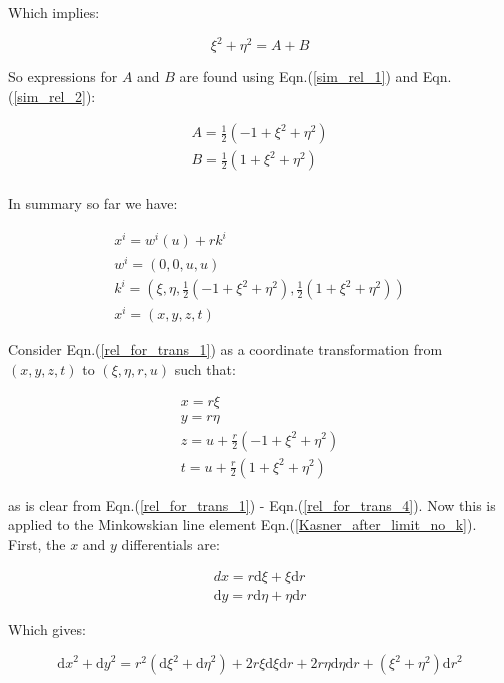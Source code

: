 \noindent Which implies:

\begin{equation}\label{sim_rel_2}
\xi^2 + \eta^2 = A + B 
\end{equation}

\noindent So expressions for $A$ and $B$ are found using Eqn.(\ref{sim_rel_1}) and Eqn.(\ref{sim_rel_2}):

\begin{eqnarray*}
A = \frac{1}{2} (-1 + \xi^2 + \eta^2) \\
B = \frac{1}{2} (1 + \xi^2 + \eta^2) \\
\end{eqnarray*}

In summary so far we have:

\begin{eqnarray}
x^i = w^i (u) + r k^i \label{rel_for_trans_1}\\
w^i = (0,0, u,u) \label{rel_for_trans_2}\\
k^i = (\xi, \eta, \frac{1}{2} (-1 + \xi^2 + \eta^2), \frac{1}{2} (1 + \xi^2 + \eta^2)) \label{rel_for_trans_3}\\
x^i = (x, y, z, t) \label{rel_for_trans_4}  
\end{eqnarray}

Consider Eqn.(\ref{rel_for_trans_1}) as a coordinate transformation from $(x,y,z,t)$ to $(\xi,\eta, r, u )$ such that:

\begin{eqnarray}
x = r \xi \nonumber \\
y = r \eta \nonumber \\
z = u + \frac{r}{2} (-1 + \xi^2 + \eta^2) \nonumber \\
t = u + \frac{r}{2} (1 + \xi^2 + \eta^2)  \label{trans_x_to_xi} 
\end{eqnarray} 

\noindent as is clear from Eqn.(\ref{rel_for_trans_1}) - Eqn.(\ref{rel_for_trans_4}). Now this is applied to the Minkowskian line element Eqn.(\ref{Kasner_after_limit_no_k}). First, the $x$ and $y$ differentials are:

\begin{eqnarray*} 
dx = r \mathrm{d}\xi + \xi \mathrm{d}r \\
\mathrm{d}y = r \mathrm{d}\eta + \eta \mathrm{d}r 
\end{eqnarray*} 

\noindent Which gives:

\begin{equation}\label{differentials_1}
{\mathrm{d}x}^2 + {\mathrm{d}y}^2 = r^2 ({\mathrm{d}\xi}^2 + {\mathrm{d}\eta}^2) + 2 r \xi {\mathrm{d}\xi} {\mathrm{d}r} + 2 r \eta {\mathrm{d}\eta}{\mathrm{d}r} + (\xi^2 + \eta^2) {\mathrm{d}r}^2
\end{equation}

